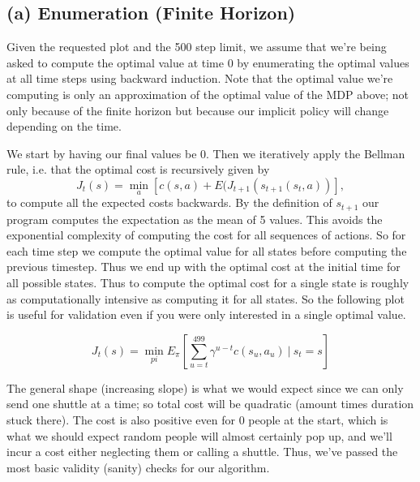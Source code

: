\documentclass{article}
\begin{document}
\subsection{(a) Enumeration (Finite Horizon)}
Given the requested plot and the 500 step limit, we assume that we're being asked to compute the optimal value at time 0 by enumerating the optimal values at all time steps using backward induction. Note that the optimal value we're computing is only an approximation of the optimal value of the MDP above; not only because of the finite horizon but because our implicit policy will change depending on the time. 

We start by having our final values be 0. Then we iteratively apply the Bellman rule, i.e. that the optimal cost is recursively given by
$$J_t(s) = \min_a  \left[ c(s,a) + E(J_{t+1}(s_{t+1}(s_t,a))\right], $$
to compute all the expected costs backwards. By the definition of $s_{t+1}$ our program computes the expectation as the mean of 5 values. This avoids the exponential complexity of computing the cost for all sequences of actions. So for each time step we compute the optimal value for all states before computing the previous timestep. Thus we end up with the optimal cost at the initial time for all possible states. Thus to compute the optimal cost for a single state is roughly as computationally intensive as computing it for all states. So the following plot is useful for validation even if you were only interested in a single optimal value.


$$J_t(s) = \min_{pi} E_{\pi} \left[ \sum_{u=t}^{499} \gamma^{u-t} c(s_u, a_u) \ | \  s_t = s \right] $$

The general shape (increasing slope) is what we would expect since we can only send one shuttle at a time; so total cost will be quadratic (amount times duration stuck there). The cost is also positive even for 0 people at the start, which is what we should expect random people will almost certainly pop up, and we'll incur a cost either neglecting them or calling a shuttle. Thus, we've passed the most basic validity (sanity) checks for our algorithm.
\end{document}
